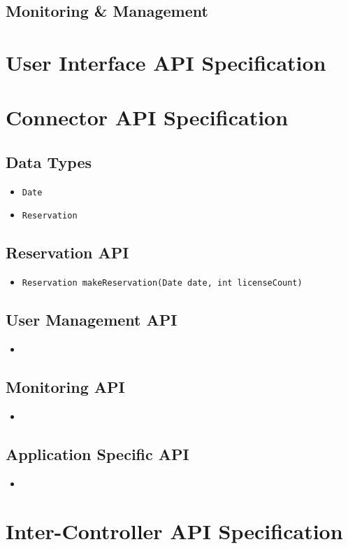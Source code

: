\documentclass[a4paper]{report}
\newcommand{\APIcmd}[1]{\item \texttt{#1}}
\newenvironment{APIdef}{\begin{itemize}}{\end{itemize}}
\begin{document}
\section{Monitoring \& Management}



\chapter{User Interface API Specification}

\chapter{Connector API Specification}

\section{Data Types}

\begin{APIdef}

\APIcmd{Date}

\APIcmd{Reservation}

\end{APIdef}


\section{Reservation API}

\begin{APIdef}

\APIcmd{Reservation makeReservation(Date date, int licenseCount)}

\end{APIdef}




\section{User Management API}

\begin{itemize}

\item

\end{itemize}


\section{Monitoring API}

\begin{itemize}

\item 

\end{itemize}


\section{Application Specific API}

\begin{itemize}

\item

\end{itemize}


\chapter{Inter-Controller API Specification}
\end{document}
